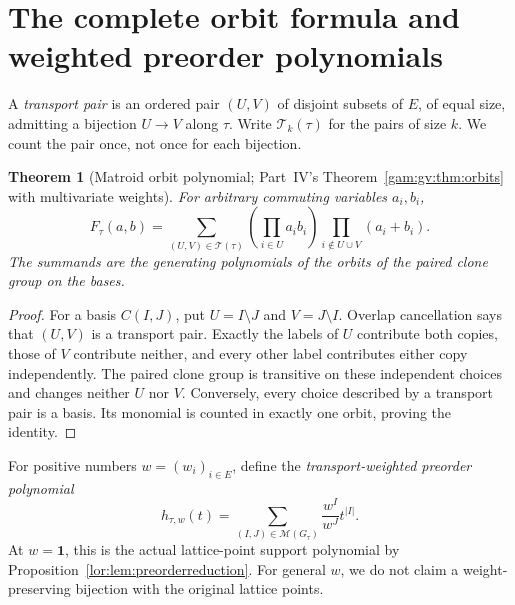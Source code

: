 \documentclass[11pt]{article}
\numberwithin{equation}{section}
\newtheorem{theorem}{Theorem}[section]
\theoremstyle{definition}
\newcommand{\one}{\mathbf 1}
\newcommand{\PM}{\mathcal M}
\newcommand{\Tset}{\mathcal T}
\begin{document}
\section{The complete orbit formula and weighted preorder polynomials}
\label{mat:sec:weighted}
A \emph{transport pair} is an ordered pair $(U,V)$ of disjoint subsets of
$E$, of equal size, admitting a bijection $U\to V$ along $\tau$.
Write $\Tset_k(\tau)$ for the pairs of size $k$. We count the pair once,
not once for each bijection.

\begin{theorem}[Matroid orbit polynomial; Part~IV's Theorem~\ref{gam:gv:thm:orbits} with multivariate weights]\label{mat:thm:orbit}
For arbitrary commuting variables $a_i,b_i$,
\begin{equation}
 F_\tau(a,b)=
 \sum_{(U,V)\in\Tset(\tau)}
       \left(\prod_{i\in U}a_i b_i\right)
       \prod_{i\notin U\cup V}(a_i+b_i).
\label{mat:eq:orbit}
\end{equation}
The summands are the generating polynomials of the orbits of the paired
clone group on the bases.
\end{theorem}
\begin{proof}
For a basis $C(I,J)$, put $U=I\setminus J$ and $V=J\setminus I$.
Overlap cancellation says that $(U,V)$ is a transport pair. Exactly the
labels of $U$ contribute both copies, those of $V$ contribute neither, and
every other label contributes either copy independently. The paired clone
group is transitive on these independent choices and changes neither $U$
nor $V$. Conversely, every choice described by a transport pair is a basis.
Its monomial is counted in exactly one orbit, proving the identity.
\end{proof}

For positive numbers $w=(w_i)_{i\in E}$, define the
\emph{transport-weighted preorder polynomial}
\begin{equation}
 h_{\tau,w}(t)=
 \sum_{(I,J)\in\PM(G_\tau)}\frac{w^I}{w^J}t^{|I|}.
\label{mat:eq:hw}
\end{equation}
At $w=\one$, this is the actual lattice-point support polynomial by
Proposition~\ref{lor:lem:preorderreduction}. For general $w$, we do not claim a
weight-preserving bijection with the original lattice points.
\end{document}
